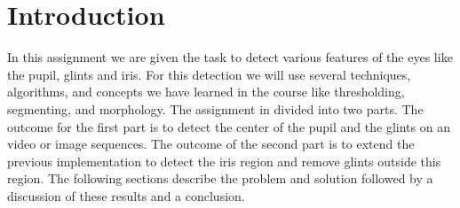 \section{Introduction}
In this assignment we are given the task to detect various features of the eyes like the pupil, glints and iris. For this detection we will use several techniques, algorithms, and concepts we have learned in the course like thresholding, segmenting, and morphology. The assignment in divided into two parts. The outcome for the first part is to detect the center of the pupil and the glints on an video or image sequences. The outcome of the second part is to extend the previous implementation to detect the iris region and remove glints outside this region. The following sections describe the problem and solution followed by a discussion of these results and a conclusion.